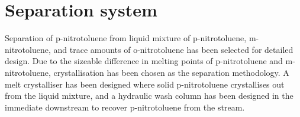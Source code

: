 \section*{Separation system}

Separation of p-nitrotoluene from liquid mixture of p-nitrotoluene, m-nitrotoluene, and trace amounts of o-nitrotoluene has been selected for detailed design. Due to the sizeable difference in melting points of p-nitrotoluene and m-nitrotoluene, crystallisation has been chosen as the separation methodology. A melt crystalliser has been designed where solid p-nitrotoluene crystallises out from the liquid mixture, and a hydraulic wash column has been designed in the immediate downstream to recover p-nitrotoluene from the stream. 